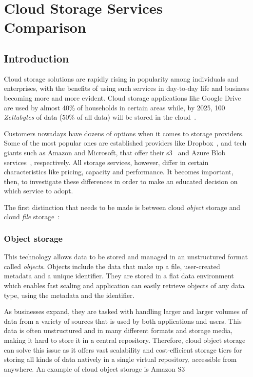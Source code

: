 \chapter{Cloud Storage Services Comparison}


\section{Introduction}
Cloud storage solutions are rapidly rising in popularity among individuals and enterprises, with the benefits of using such services in day-to-day life and business becoming more and more evident. Cloud storage applications like Google Drive are used by almost 40\% of households in certain areas while, by 2025, 100 \textit{Zettabytes} of data (50\% of all data) will be stored in the cloud~\cite{zeta}.

Customers nowadays have dozens of options when it comes to storage providers. Some of the most popular ones are established providers like Dropbox~\cite{dropbox}, and tech giants such as Amazon and Microsoft, that offer their \ac{s3}~\cite{s3} and Azure Blob services~\cite{blob}, respectively. All storage services, however, differ in certain characteristics like pricing, capacity and performance. It becomes important, then, to investigate these differences in order to make an educated decision on which service to adopt.

The first distinction that needs to be made is between cloud \textit{object} storage and cloud \textit{file} storage~\cite{objectvsfile, objectvsfile2}:

\subsection{Object storage}
This technology allows data to be stored and managed in an unstructured format called \textit{objects}. Objects include the data that make up a file, user-created metadata and a unique identifier. They are stored in a flat data environment which enables fast scaling and application can easily retrieve objects of any data type, using the metadata and the identifier.

As businesses expand, they are tasked with handling larger and larger volumes of data from a variety of sources that is used by both applications and users. This data is often unstructured and in many different formats and storage media, making it hard to store it in a central repository. Therefore, cloud object storage can solve this issue as it offers vast scalability and cost-efficient storage tiers for storing all kinds of data natively in a single virtual repository, accessible from anywhere. An example of cloud object storage is Amazon S3~\cite{s3}

